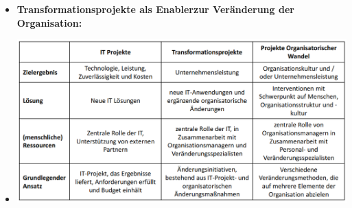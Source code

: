 \documentclass[12pt,a4paper]{article}
\begin{document}
\begin{itemize}
   \item \textbf{Transformationsprojekte als Enablerzur Veränderung der Organisation:}
   \item[] \includegraphics[scale=0.3]{ziele.png}
\end{itemize}


\vspace{0.5cm}
\end{document}
